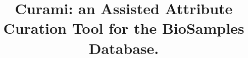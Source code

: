 \documentclass{bmcart}
\begin{document}
\begin{frontmatter}

\begin{fmbox}


\title{Curami: an Assisted Attribute Curation Tool for the BioSamples Database.}


\author[
   addressref={aff1},                   %
   corref={aff1},                       %
   noteref={n1},                        %
   email={hewgreen@ebi.co.uk}   %
]{\inits{} }
 

\address[id=aff1]{%
  ,
  ,
  ,
}



\end{fmbox}
\end{frontmatter}
\end{document}
